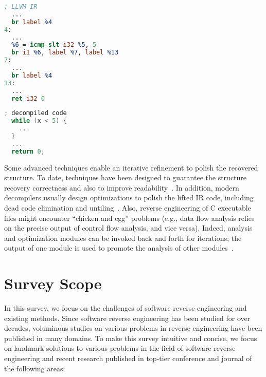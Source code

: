 \vspace*{3pt}
\noindent\hspace*{36pt}\begin{minipage}{.40\linewidth}
\begin{lstlisting}[language=llvm]
 ; LLVM IR
  ...
  br label %4
4:
  ...
  %6 = icmp slt i32 %5, 5
  br i1 %6, label %7, label %13
7:
  ...
  br label %4
13:
  ...
  ret i32 0
\end{lstlisting}
\end{minipage}\hspace*{24pt}
\begin{minipage}{.40\linewidth}
\begin{lstlisting}[language=C]
 ; decompiled code
  while (x < 5) {
    ...
  }
  ...
  return 0;
\end{lstlisting}
\end{minipage}

Some advanced techniques enable an iterative refinement to polish the
recovered structure. To date, techniques have been designed to guarantee the
structure recovery correctness and also to improve
readability~\cite{brumley2013native,yakdan2015no}. In addition, modern
decompilers usually design optimizations to polish the lifted IR code,
including dead code elimination and untiling~\cite{brumley2013native,cifuentes1994reverse,kvroustek2017retdec}.
Also, reverse engineering of C executable files might encounter ``chicken and
egg'' problems (e.g., data flow analysis relies on the precise output of
control flow analysis, and vice versa). Indeed, analysis and optimization
modules can be invoked back and forth for iterations; the output of one module
is used to promote the analysis of other modules~\cite{kvroustek2017retdec}.


\section{Survey Scope} \label{sec:background-scope}
In this survey, we focus on the challenges of software reverse engineering and
existing methods. Since software reverse engineering has been studied for over
decades, voluminous studies on various problems in reverse engineering have
been published in many domains.
To make this survey intuitive and concise, we focus on landmark solutions to
various problems in the field of software reverse engineering and recent
research published in top-tier conference and journal of the following areas:

